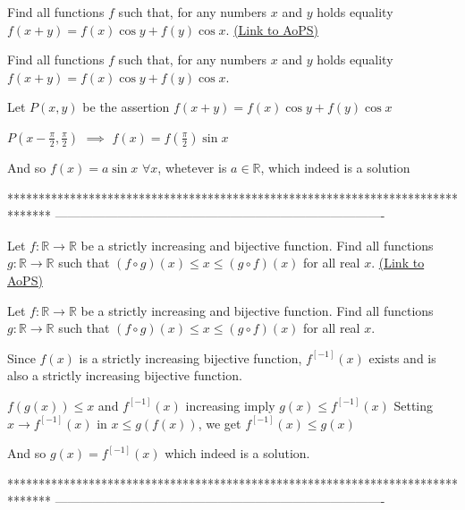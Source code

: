 \begin{problem}
	Find all functions $f$ such that, for any numbers $x$ and $y$  holds equality $f(x+y) =f(x)\cos{y}+f(y)\cos{x}$.
	\flushright \href{https://artofproblemsolving.com/community/c6h551168}{(Link to AoPS)}
\end{problem}



\begin{solution}
	\begin{tcolorbox}Find all functions $f$ such that, for any numbers $x$ and $y$  holds equality $f(x+y) =f(x)\cos{y}+f(y)\cos{x}$.\end{tcolorbox}
Let $P(x,y)$ be the assertion $f(x+y)=f(x)\cos y+f(y)\cos x$

$P(x-\frac{\pi}2,\frac{\pi}2)$ $\implies$  $f(x)=f(\frac{\pi}2)\sin x$

And so $\boxed{f(x)=a\sin x}$ $\forall x$, whetever is $a\in\mathbb R$, which indeed is a solution
\end{solution}
*******************************************************************************
-------------------------------------------------------------------------------

\begin{problem}
	Let $f: \mathbb{R}\to\mathbb{R}$ be a strictly increasing and bijective function. Find all functions $g: \mathbb{R}\to\mathbb{R}$ such that $(f{\circ}g)(x){\leq}x{\leq}(g{\circ}f)(x)$ for all real $x$.
	\flushright \href{https://artofproblemsolving.com/community/c6h552307}{(Link to AoPS)}
\end{problem}



\begin{solution}
	\begin{tcolorbox}Let $f: \mathbb{R}\to\mathbb{R}$ be a strictly increasing and bijective function. Find all functions $g: \mathbb{R}\to\mathbb{R}$ such that $(f{\circ}g)(x){\leq}x{\leq}(g{\circ}f)(x)$ for all real $x$.\end{tcolorbox}
Since $f(x)$ is a strictly increasing bijective function, $f^{[-1]}(x)$ exists and is also a strictly increasing bijective function.

$f(g(x))\le x$ and $f^{[-1]}(x)$ increasing imply $g(x)\le f^{[-1]}(x)$
Setting $x\to f^{[-1]}(x)$ in $x\le g(f(x))$, we get $f^{[-1]}(x)\le g(x)$

And so $\boxed{g(x)=f^{[-1]}(x)}$ which indeed is a solution.
\end{solution}
*******************************************************************************
-------------------------------------------------------------------------------

